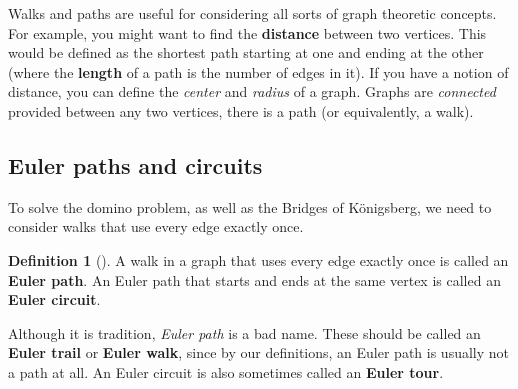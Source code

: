 \documentclass[10pt,]{book}
\newcommand{\terminology}[1]{\textbf{#1}}
\theoremstyle{plain}
\theoremstyle{definition}
\newtheorem{definition}[theorem]{Definition}
\theoremstyle{definition}
\theoremstyle{definition}
\numberwithin{equation}{chapter}
\begin{document}
\par
\hypertarget{p-1368}{}%
Walks and paths are useful for considering all sorts of graph theoretic concepts.  For example, you might want to find the \terminology{distance} between two vertices.  This would be defined as the shortest path starting at one and ending at the other (where the \terminology{length} of a path is the number of edges in it).  If you have a notion of distance, you can define the \emph{center} and \emph{radius} of a graph.  Graphs are \emph{connected} provided between any two vertices, there is a path (or equivalently, a walk).%
\typeout{************************************************}
\typeout{************************************************}
\subsection[{Euler paths and circuits}]{Euler paths and circuits}\label{subsec_eulerpaths}
\hypertarget{p-1369}{}%
To solve the domino problem, as well as the Bridges of Königsberg, we need to consider walks that use every edge exactly once.%
\begin{definition}[{}]\label{def-eulerpath}
\hypertarget{p-1370}{}%
A walk in a graph that uses every edge exactly once is called an \terminology{Euler path}.  An Euler path that starts and ends at the same vertex is called an \terminology{Euler circuit}.%
\end{definition}
\hypertarget{p-1371}{}%
Although it is tradition, \emph{Euler path} is a bad name.  These should be called an \terminology{Euler trail} or \terminology{Euler walk}, since by our definitions, an Euler path is usually not a path at all.  An Euler circuit is also sometimes called an \terminology{Euler tour}.%
\end{document}
